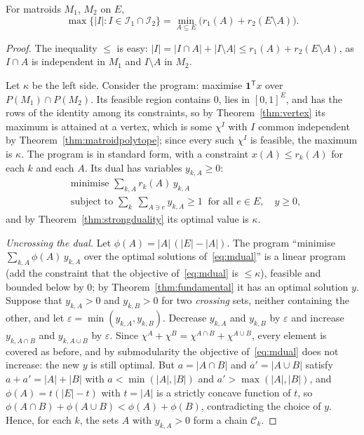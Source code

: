 \begin{theorem}\label{thm:matroidintersection}
For matroids $M_1$, $M_2$ on $E$,
\[
\max\{|I|:I\in\mathcal I_1\cap\mathcal I_2\}=\min_{A\subseteq E}\bigl(r_1(A)+r_2(E\setminus A)\bigr).
\]
\end{theorem}
\begin{proof}
The inequality $\le$ is easy: $|I|=|I\cap A|+|I\setminus A|\le r_1(A)+r_2(E\setminus A)$, as $I\cap A$ is independent in $M_1$ and $I\setminus A$ in $M_2$.

Let $\kappa$ be the left side. Consider the program: maximise $\mathbf 1^{\mathsf T}x$ over $P(M_1)\cap P(M_2)$. Its feasible region contains $0$, lies in $[0,1]^E$, and has the rows of the identity among its constraints, so by
Theorem~\ref{thm:vertex} its maximum is attained at a vertex, which is some $\chi^I$ with $I$ common independent by Theorem~\ref{thm:matroidpolytope}; since every such $\chi^I$ is feasible, the maximum is $\kappa$. The program is in
standard form, with a constraint $x(A)\le r_k(A)$ for each $k$ and each $A$. Its dual has variables $y_{k,A}\ge0$:
\begin{equation}\label{eq:mdual}
\begin{aligned}
&\text{minimise }\sum_{k,A}r_k(A)\,y_{k,A}\\
&\text{subject to }\sum_{k}\ \sum_{A\ni e}y_{k,A}\ge1\ \text{ for all }e\in E,\quad y\ge0,
\end{aligned}
\end{equation}
and by Theorem~\ref{thm:strongduality} its optimal value is $\kappa$.

\emph{Uncrossing the dual.} Let $\phi(A)=|A|\,(|E|-|A|)$. The program ``minimise $\sum_{k,A}\phi(A)\,y_{k,A}$ over the optimal solutions of~\eqref{eq:mdual}'' is a linear program (add the constraint that the objective of~\eqref{eq:mdual} is $\le\kappa$), feasible and
bounded below by $0$; by Theorem~\ref{thm:fundamental} it has an optimal solution $y$. Suppose that $y_{k,A}>0$ and $y_{k,B}>0$ for two \emph{crossing} sets, neither containing the other, and let $\varepsilon=\min(y_{k,A},y_{k,B})$. Decrease
$y_{k,A}$ and $y_{k,B}$ by $\varepsilon$ and increase $y_{k,A\cap B}$ and $y_{k,A\cup B}$ by $\varepsilon$. Since $\chi^A+\chi^B=\chi^{A\cap B}+\chi^{A\cup B}$, every element is covered as before, and by submodularity the objective of~\eqref{eq:mdual} does
not increase: the new $y$ is still optimal. But $a=|A\cap B|$ and $a'=|A\cup B|$ satisfy $a+a'=|A|+|B|$ with $a<\min(|A|,|B|)$ and $a'>\max(|A|,|B|)$, and $\phi(A)=t(|E|-t)$ with $t=|A|$ is a strictly concave function of $t$, so
$\phi(A\cap B)+\phi(A\cup B)<\phi(A)+\phi(B)$, contradicting the choice of $y$. Hence, for each $k$, the sets $A$ with $y_{k,A}>0$ form a chain $\mathcal C_k$.


\end{proof}

